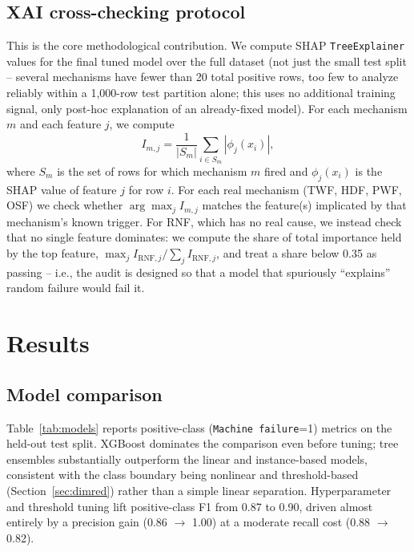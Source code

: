 \documentclass[11pt]{article}
\begin{document}
\subsection{XAI cross-checking protocol}
\label{sec:crosscheck}
This is the core methodological contribution. We compute SHAP \texttt{TreeExplainer} values for the
final tuned model over the full dataset (not just the small test split -- several mechanisms have
fewer than 20 total positive rows, too few to analyze reliably within a 1{,}000-row test partition
alone; this uses no additional training signal, only post-hoc explanation of an already-fixed
model). For each mechanism $m$ and each feature $j$, we compute
\[
  I_{m,j} = \frac{1}{|S_m|} \sum_{i \in S_m} \left| \phi_j(x_i) \right|,
\]
where $S_m$ is the set of rows for which mechanism $m$ fired and $\phi_j(x_i)$ is the SHAP value of
feature $j$ for row $i$. For each real mechanism (TWF, HDF, PWF, OSF) we check whether
$\arg\max_j I_{m,j}$ matches the feature(s) implicated by that mechanism's known trigger. For RNF,
which has no real cause, we instead check that no single feature dominates: we compute the share of
total importance held by the top feature, $\max_j I_{\text{RNF},j} / \sum_j I_{\text{RNF},j}$, and
treat a share below 0.35 as passing -- i.e., the audit is designed so that a model that spuriously
``explains'' random failure would fail it.

\section{Results}
\label{sec:results}

\subsection{Model comparison}
Table~\ref{tab:models} reports positive-class (\texttt{Machine failure}=1) metrics on the held-out
test split. XGBoost dominates the comparison even before tuning; tree ensembles substantially
outperform the linear and instance-based models, consistent with the class boundary being
nonlinear and threshold-based (Section~\ref{sec:dimred}) rather than a simple linear separation.
Hyperparameter and threshold tuning lift positive-class F1 from 0.87 to 0.90, driven almost entirely
by a precision gain (0.86 $\rightarrow$ 1.00) at a moderate recall cost (0.88 $\rightarrow$ 0.82).
\end{document}
